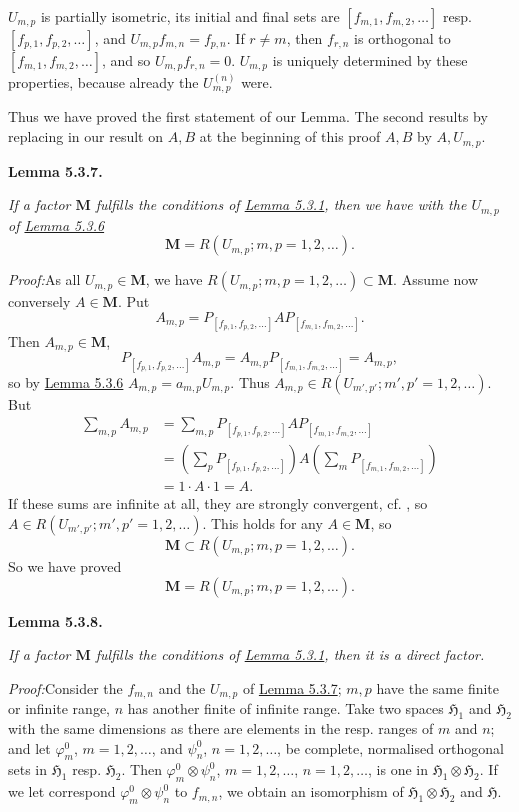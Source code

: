 \documentclass[12pt,b5paper,twoside]{article}
\newcommand{\Hspace}{\mathfrak H}
\newcommand{\M}{\mathbf M}
\newcommand{\Lemma}[1]{%
  \par\smallskip\noindent\phantomsection\label{lem:#1}\textbf{Lemma #1.}\enspace
}
\newcommand{\Proof}{\par\noindent\textit{Proof:}\enspace}
\newcommand{\lemref}[1]{\hyperref[lem:#1]{Lemma #1}}
\begin{document}
$U_{m,p}$ is partially isometric, its initial and final sets are
$[f_{m,1},f_{m,2},\ldots]$ resp. $[f_{p,1},f_{p,2},\ldots]$, and
$U_{m,p}f_{m,n}=f_{p,n}$. If $r\neq m$, then $f_{r,n}$ is orthogonal to
$[f_{m,1},f_{m,2},\ldots]$, and so $U_{m,p}f_{r,n}=0$. $U_{m,p}$ is uniquely
determined by these properties, because already the $U_{m,p}^{(n)}$ were.

Thus we have proved the first statement of our Lemma. The second results by
replacing in our result on $A,B$ at the beginning of this proof $A,B$ by
$A,U_{m,p}$.

\Lemma{5.3.7}
\emph{If a factor $\M$ fulfills the conditions of \lemref{5.3.1}, then we
have with the $U_{m,p}$ of \lemref{5.3.6}}
\[
 \M=R(U_{m,p};m,p=1,2,\ldots).
\]

\Proof As all $U_{m,p}\in\M$, we have
$R(U_{m,p};m,p=1,2,\ldots)\subset\M$. Assume now conversely $A\in\M$.
Put
\[
 A_{m,p}=P_{[f_{p,1},f_{p,2},\ldots]}
 A P_{[f_{m,1},f_{m,2},\ldots]}.
\]
Then $A_{m,p}\in\M$,
\[
 P_{[f_{p,1},f_{p,2},\ldots]}A_{m,p}
 =A_{m,p}P_{[f_{m,1},f_{m,2},\ldots]}=A_{m,p},
\]
so by \lemref{5.3.6} $A_{m,p}=a_{m,p}U_{m,p}$. Thus
$A_{m,p}\in R(U_{m',p'};m',p'=1,2,\ldots)$. But
\begin{align*}
 \sum_{m,p}A_{m,p}
 &=\sum_{m,p}P_{[f_{p,1},f_{p,2},\ldots]}
 A P_{[f_{m,1},f_{m,2},\ldots]}\\
 &=\left(\sum_pP_{[f_{p,1},f_{p,2},\ldots]}\right)
 A\left(\sum_mP_{[f_{m,1},f_{m,2},\ldots]}\right)\\
 &=1\cdot A\cdot1=A.
\end{align*}
If these sums are infinite at all, they are strongly convergent,
cf. \cite[pp.~77--78]{ref16}, so
$A\in R(U_{m',p'};m',p'=1,2,\ldots)$. This holds for any $A\in\M$, so
\[
 \M\subset R(U_{m,p};m,p=1,2,\ldots).
\]
So we have proved
\[
 \M=R(U_{m,p};m,p=1,2,\ldots).
\]

\Lemma{5.3.8}
\emph{If a factor $\M$ fulfills the conditions of \lemref{5.3.1}, then it is
a direct factor.}

\Proof Consider the $f_{m,n}$ and the $U_{m,p}$ of \lemref{5.3.7}; $m,p$
have the same finite or infinite range, $n$ has another finite of infinite
range. Take two spaces $\Hspace_1$ and $\Hspace_2$ with the same dimensions as
there are elements in the resp. ranges of $m$ and $n$; and let
$\varphi_m^0$, $m=1,2,\ldots$, and $\psi_n^0$, $n=1,2,\ldots$, be complete,
normalised orthogonal sets in $\Hspace_1$ resp. $\Hspace_2$. Then
$\varphi_m^0\otimes\psi_n^0$, $m=1,2,\ldots$, $n=1,2,\ldots$, is one in
$\Hspace_1\otimes\Hspace_2$. If we let correspond
$\varphi_m^0\otimes\psi_n^0$ to $f_{m,n}$, we obtain an isomorphism of
$\Hspace_1\otimes\Hspace_2$ and $\Hspace$.
\end{document}
